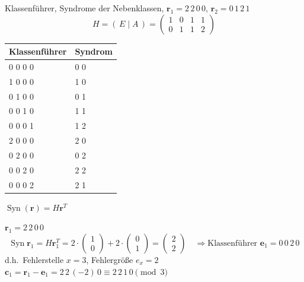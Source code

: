 \begin{loesung}
Klassenführer, Syndrome der Nebenklassen, $\mathbf{r}_1 = 2\,2\,0\,0$, $\mathbf{r}_2 = 0\,1\,2\,1$
\[
H = (\, E \mid A \,) = \begin{pmatrix} 1 & 0 & 1 & 1\\ 0 & 1 & 1 & 2 \end{pmatrix}
\]
\begin{center}
\begin{tabular}{ll}
\toprule
Klassenführer & Syndrom\\
\midrule
0 0 0 0 & 0 0\\
1 0 0 0 & 1 0\\
0 1 0 0 & 0 1\\
0 0 1 0 & 1 1\\
0 0 0 1 & 1 2\\
2 0 0 0 & 2 0\\
0 2 0 0 & 0 2\\
0 0 2 0 & 2 2\\
0 0 0 2 & 2 1\\
\bottomrule
\end{tabular}
\end{center}

$\operatorname{Syn}(\mathbf{r}) = H\mathbf{r}^T$

\medskip
$\mathbf{r}_1 = 2\,2\,0\,0$
\[
\operatorname{Syn} \mathbf{r}_1 = H\mathbf{r}_1^T = 2 \cdot \begin{pmatrix} 1\\ 0 \end{pmatrix} + 2 \cdot \begin{pmatrix} 0\\ 1 \end{pmatrix} = \begin{pmatrix} 2\\ 2 \end{pmatrix}
\quad\Rightarrow \text{Klassenführer } \mathbf{e}_1 = 0\,0\,2\,0
\]
d.h.\ Fehlerstelle $x = 3$, Fehlergröße $e_x = 2$\\
$\mathbf{c}_1 = \mathbf{r}_1 - \mathbf{e}_1 = 2\,2\,(-2)\,0 \equiv 2\,2\,1\,0 \pmod{3}$


\end{loesung}
